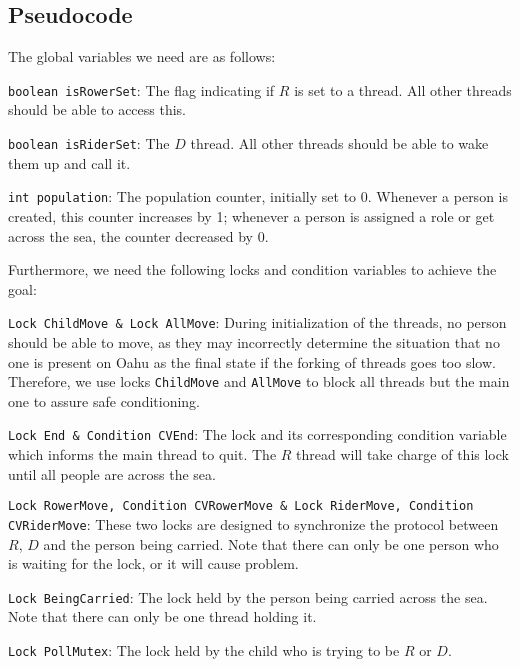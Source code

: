 \documentclass{article}
\begin{document}
\begin{spacing}{1.1}
\subsection{Pseudocode}
The global variables we need are as follows:
\begin{asparaitem}
  \item \texttt{boolean isRowerSet}: The flag indicating if $R$ is set to a thread. All other threads should be able to access this.\\ 
  \item \texttt{boolean isRiderSet}: The $D$ thread. All other threads should be able to wake them up and call it.\\
  \item \texttt{int population}: The population counter, initially set to 0. Whenever a person is created, this counter increases by 1; whenever a person is assigned a role or get across the sea, the counter decreased by 0.\\
\end{asparaitem}

Furthermore, we need the following locks and condition variables to achieve the goal:\\
\begin{asparaitem}
  \item \texttt{Lock ChildMove \& Lock AllMove}: During initialization of the threads, no person should be able to move, as they may incorrectly determine the situation that no one is present on Oahu as the final state if the forking of threads goes too slow. Therefore, we use locks \texttt{ChildMove} and \texttt{AllMove} to block all threads but the main one to assure safe conditioning.\\
  \item \texttt{Lock End \& Condition CVEnd}: The lock and its corresponding condition variable which informs the main thread to quit. The $R$ thread will take charge of this lock until all people are across the sea.\\
  \item \texttt{Lock RowerMove, Condition CVRowerMove \& Lock RiderMove, Condition CVRiderMove}: These two locks are designed to synchronize the protocol between $R$, $D$ and the person being carried. Note that there can only be one person who is waiting for the lock, or it will cause problem.\\
  \item \texttt{Lock BeingCarried}: The lock held by the person being carried across the sea. Note that there can only be one thread holding it.\\
  \item \texttt{Lock PollMutex}: The lock held by the child who is trying to be $R$ or $D$.\\
\end{asparaitem}


\end{spacing}
\end{document}
